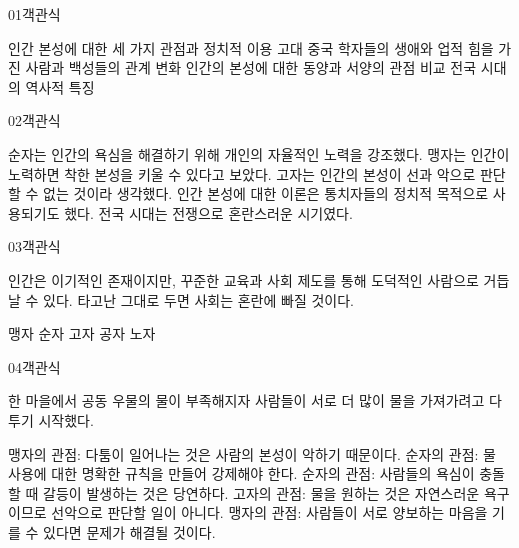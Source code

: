\documentclass[fs9,seriesFre]{korfarm-base}
\begin{document}
\par\medskip
\kfBeginMC
\begin{kfQBlock}{01}{객관식}
\begin{kfChoices}
\kfChoice 인간 본성에 대한 세 가지 관점과 정치적 이용
\kfChoice 고대 중국 학자들의 생애와 업적
\kfChoice 힘을 가진 사람과 백성들의 관계 변화
\kfChoice 인간의 본성에 대한 동양과 서양의 관점 비교
\kfChoice 전국 시대의 역사적 특징
\end{kfChoices}
\end{kfQBlock}
\begin{kfQBlock}{02}{객관식}
\begin{kfChoices}
\kfChoice 순자는 인간의 욕심을 해결하기 위해 개인의 자율적인 노력을 강조했다.
\kfChoice 맹자는 인간이 노력하면 착한 본성을 키울 수 있다고 보았다.
\kfChoice 고자는 인간의 본성이 선과 악으로 판단할 수 없는 것이라 생각했다.
\kfChoice 인간 본성에 대한 이론은 통치자들의 정치적 목적으로 사용되기도 했다.
\kfChoice 전국 시대는 전쟁으로 혼란스러운 시기였다.
\end{kfChoices}
\end{kfQBlock}
\begin{kfQBlock}{03}{객관식}
\begin{kfEvidence}인간은 이기적인 존재이지만, 꾸준한 교육과 사회 제도를 통해 도덕적인 사람으로 거듭날 수 있다. 타고난 그대로 두면 사회는 혼란에 빠질 것이다.\end{kfEvidence}
\begin{kfChoices}
\kfChoice 맹자
\kfChoice 순자
\kfChoice 고자
\kfChoice 공자
\kfChoice 노자
\end{kfChoices}
\end{kfQBlock}
\begin{kfQBlock}{04}{객관식}
\begin{kfEvidence}한 마을에서 공동 우물의 물이 부족해지자 사람들이 서로 더 많이 물을 가져가려고 다투기 시작했다.\end{kfEvidence}
\begin{kfChoices}
\kfChoice 맹자의 관점: 다툼이 일어나는 것은 사람의 본성이 악하기 때문이다.
\kfChoice 순자의 관점: 물 사용에 대한 명확한 규칙을 만들어 강제해야 한다.
\kfChoice 순자의 관점: 사람들의 욕심이 충돌할 때 갈등이 발생하는 것은 당연하다.
\kfChoice 고자의 관점: 물을 원하는 것은 자연스러운 욕구이므로 선악으로 판단할 일이 아니다.
\kfChoice 맹자의 관점: 사람들이 서로 양보하는 마음을 기를 수 있다면 문제가 해결될 것이다.
\end{kfChoices}
\end{kfQBlock}
\end{document}

